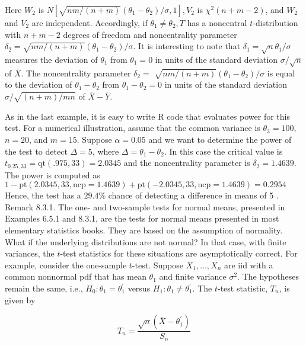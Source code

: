 Here $W_{2}$ is $N\left[\sqrt{n m /(n+m)}\left(\theta_{1}-\theta_{2}\right) / \sigma, 1\right], V_{2}$ is $\chi^{2}(n+m-2)$, and $W_{2}$ and $V_{2}$ are independent. Accordingly, if $\theta_{1} \neq \theta_{2}, T$ has a noncentral $t$-distribution with $n+m-2$ degrees of freedom and noncentrality parameter $\delta_{2}=\sqrt{n m /(n+m)}\left(\theta_{1}-\theta_{2}\right) / \sigma$. It is interesting to note that $\delta_{1}=\sqrt{n} \theta_{1} / \sigma$ measures the deviation of $\theta_{1}$ from $\theta_{1}=0$ in units of the standard deviation $\sigma / \sqrt{n}$ of $\bar{X}$. The noncentrality parameter $\delta_{2}=$ $\sqrt{n m /(n+m)}\left(\theta_{1}-\theta_{2}\right) / \sigma$ is equal to the deviation of $\theta_{1}-\theta_{2}$ from $\theta_{1}-\theta_{2}=0$ in units of the standard deviation $\sigma / \sqrt{(n+m) / m n}$ of $\bar{X}-\bar{Y}$.

As in the last example, it is easy to write R code that evaluates power for this test. For a numerical illustration, assume that the common variance is $\theta_{3}=100$, $n=20$, and $m=15$. Suppose $\alpha=0.05$ and we want to determine the power of the test to detect $\Delta=5$, where $\Delta=\theta_{1}-\theta_{2}$. In this case the critical value is $t_{0.25,33}=\mathrm{qt}(.975,33)=2.0345$ and the noncentrality parameter is $\delta_{2}=1.4639$. The power is computed as\\
$1-\mathrm{pt}(2.0345,33, \mathrm{ncp}=1.4639)+\mathrm{pt}(-2.0345,33, \mathrm{ncp}=1.4639)=0.2954$\\
Hence, the test has a $29.4 \%$ chance of detecting a difference in means of 5 .\\
Remark 8.3.1. The one- and two-sample tests for normal means, presented in Examples 6.5.1 and 8.3.1, are the tests for normal means presented in most elementary statistics books. They are based on the assumption of normality. What if the underlying distributions are not normal? In that case, with finite variances, the $t$-test statistics for these situations are asymptotically correct. For example, consider the one-sample $t$-test. Suppose $X_{1}, \ldots, X_{n}$ are iid with a common nonnormal pdf that has mean $\theta_{1}$ and finite variance $\sigma^{2}$. The hypotheses remain the same, i.e., $H_{0}: \theta_{1}=\theta_{1}^{\prime}$ versus $H_{1}: \theta_{1} \neq \theta_{1}^{\prime}$. The $t$-test statistic, $T_{n}$, is given by


\begin{equation*}
T_{n}=\frac{\sqrt{n}\left(\bar{X}-\theta_{1}^{\prime}\right)}{S_{n}} \tag{8.3.6}
\end{equation*}


